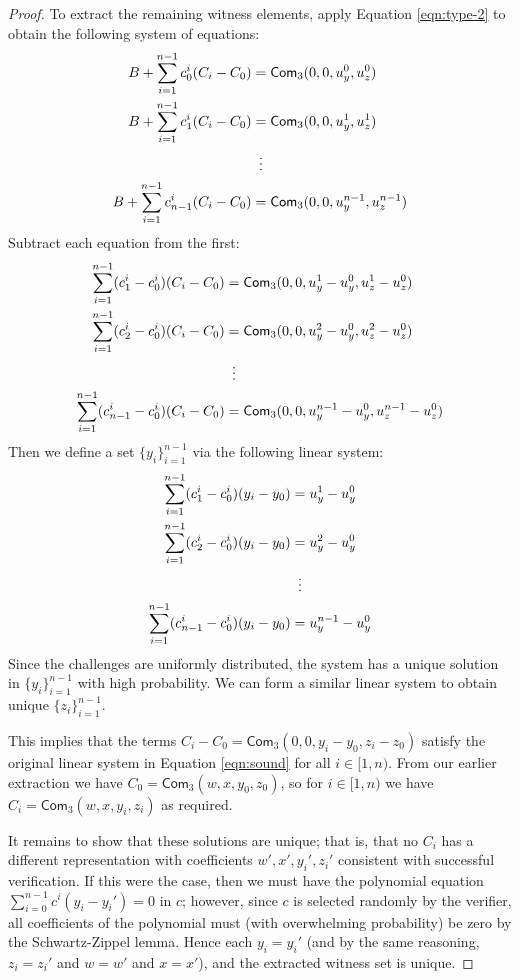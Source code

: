 \documentclass{article}
\newcommand{\func}[1]{\mathsf{#1}}
\newcommand{\com}{\func{Com}}
\begin{document}
\begin{proof}
To extract the remaining witness elements, apply Equation \ref{eqn:type-2} to obtain the following system of equations:
\begin{gather}
\begin{aligned}
    \label{eqn:sound}
    B + \sum_{i=1}^{n-1} c_0^i(C_i - C_0) &= \com_3(0, 0, u_y^0, u_z^0) \\
    B + \sum_{i=1}^{n-1} c_1^i(C_i - C_0) &= \com_3(0, 0, u_y^1, u_z^1) \\
    &\vdotswithin{=} \\
    B + \sum_{i=1}^{n-1} c_{n-1}^i(C_i - C_0) &= \com_3(0, 0, u_y^{n-1}, u_z^{n-1})
\end{aligned}
\end{gather}
Subtract each equation from the first:
\begin{align*}
    \sum_{i=1}^{n-1} (c_1^i - c_0^i)(C_i - C_0) &= \com_3(0, 0, u_y^1 - u_y^0, u_z^1 - u_z^0) \\
    \sum_{i=1}^{n-1} (c_2^i - c_0^i)(C_i - C_0) &= \com_3(0, 0, u_y^2 - u_y^0, u_z^2 - u_z^0) \\
    &\vdotswithin{=} \\
    \sum_{i=1}^{n-1} (c_{n-1}^i - c_0^i)(C_i - C_0) &= \com_3(0, 0, u_y^{n-1} - u_y^0, u_z^{n-1} - u_z^0)
\end{align*}
Then we define a set $\{y_i\}_{i=1}^{n-1}$ via the following linear system:
\begin{align*}
    \sum_{i=1}^{n-1} (c_1^i - c_0^i)(y_i - y_0) &= u_y^1 - u_y^0 \\
    \sum_{i=1}^{n-1} (c_2^i - c_0^i)(y_i - y_0) &= u_y^2 - u_y^0 \\
    &\vdotswithin{=} \\
    \sum_{i=1}^{n-1} (c_{n-1}^i - c_0^i)(y_i - y_0) &= u_y^{n-1} - u_y^0
\end{align*}
Since the challenges are uniformly distributed, the system has a unique solution in $\{y_i\}_{i=1}^{n-1}$ with high probability.
We can form a similar linear system to obtain unique $\{z_i\}_{i=1}^{n-1}$.

This implies that the terms $C_i - C_0 = \com_3(0, 0, y_i - y_0, z_i - z_0)$ satisfy the original linear system in Equation \ref{eqn:sound} for all $i \in [1,n)$.
From our earlier extraction we have $C_0 = \com_3(w, x, y_0, z_0)$, so for $i \in [1,n)$ we have $C_i = \com_3(w, x, y_i, z_i)$ as required.

It remains to show that these solutions are unique; that is, that no $C_i$ has a different representation with coefficients $w',x',y_i',z_i'$ consistent with successful verification.
If this were the case, then we must have the polynomial equation $\sum_{i=0}^{n-1} c^i(y_i - y_i') = 0$ in $c$; however, since $c$ is selected randomly by the verifier, all coefficients of the polynomial must (with overwhelming probability) be zero by the Schwartz-Zippel lemma.
Hence each $y_i = y_i'$ (and by the same reasoning, $z_i = z_i'$ and $w = w'$ and $x = x'$), and the extracted witness set is unique.


\end{proof}
\end{document}
